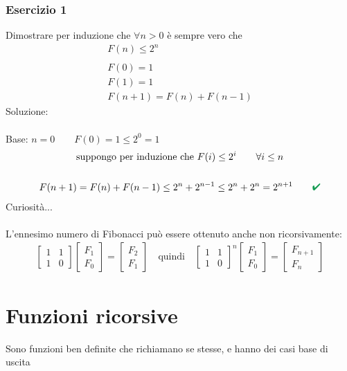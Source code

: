 \documentclass[italian]{article}
\renewcommand{\checkmark}{\textcolor{ForestGreen}{\text{$\qquad$\ding{52}}}}
\begin{document}
\subsubsection{Esercizio 1}
Dimostrare per induzione che $\forall n > 0$ è sempre vero che
\begin{gather*}
	F(n) \leq 2^n \\\\
	F(0) = 1\\
	F(1) = 1\\
	F(n+1) = F(n) + F(n-1)
\end{gather*}
Soluzione:\\\\
Base: $n=0 \qquad F(0)=1 \leq 2^0=1$ \checkmark
\begin{gather*}
	\text{suppongo per induzione che } F(i) \leq 2^i \qquad \forall i \leq n\\\\
	F(n+1) = F(n) + F(n-1) \leq 2^n + 2^{n-1} \leq 2^n + 2^n = 2^{n+1} \checkmark\\
\end{gather*}
Curiosità...\\\\
L'ennesimo numero di Fibonacci può essere ottenuto anche non ricorsivamente:
\begin{gather*}
	\begin{bmatrix}
	1 & 1 \\ 1 & 0
	\end{bmatrix}
	\begin{bmatrix}
		F_1 \\ F_0
	\end{bmatrix}
	=
	\begin{bmatrix}F_2 \\ F_1\end{bmatrix}
	\quad\text{quindi}\quad
	\begin{bmatrix}
		1 & 1 \\ 1 & 0
	\end{bmatrix}^n
	\begin{bmatrix}
		F_1 \\ F_0
	\end{bmatrix}
	=
	\begin{bmatrix}
		F_{n+1} \\ F_n
	\end{bmatrix}
\end{gather*}

\pagebreak
\section{Funzioni ricorsive}
Sono funzioni ben definite che richiamano se stesse, e hanno dei casi base di uscita
\end{document}
